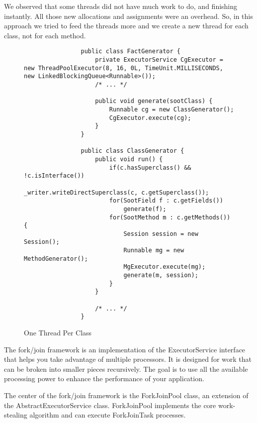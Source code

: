 \documentclass{dithesis}
\begin{document}
        We observed that some threads did not have much work to do, and finishing instantly. All those new allocations and assignments were an overhead. So, in this approach we tried to feed the threads more and we create a new thread for each class, not for each method.  
        \begin{figure}[H]
            \begin{lstlisting}
                public class FactGenerator {
                    private ExecutorService CgExecutor = new ThreadPoolExecutor(8, 16, 0L, TimeUnit.MILLISECONDS, new LinkedBlockingQueue<Runnable>());
                    /* ... */

                    public void generate(sootClass) {
                        Runnable cg = new ClassGenerator();
                        CgExecutor.execute(cg);
                    }
                }

                public class ClassGenerator {
                    public void run() {
                        if(c.hasSuperclass() && !c.isInterface())
                            _writer.writeDirectSuperclass(c, c.getSuperclass());
                        for(SootField f : c.getFields())
                            generate(f);
                        for(SootMethod m : c.getMethods()) {
                            Session session = new Session();
                            Runnable mg = new MethodGenerator();
                            MgExecutor.execute(mg);
                            generate(m, session);
                        }
                    }

                    /* ... */
                }
            \end{lstlisting}
        \caption{One Thread Per Class}
        \end{figure}

        The fork/join framework is an implementation of the ExecutorService interface that helps you take advantage of multiple processors. It is designed for work that can be broken into smaller pieces recursively. The goal is to use all the available processing power to enhance the performance of your application.

        The center of the fork/join framework is the ForkJoinPool class, an extension of the AbstractExecutorService class. ForkJoinPool implements the core work-stealing algorithm and can execute ForkJoinTask processes.
\end{document}
